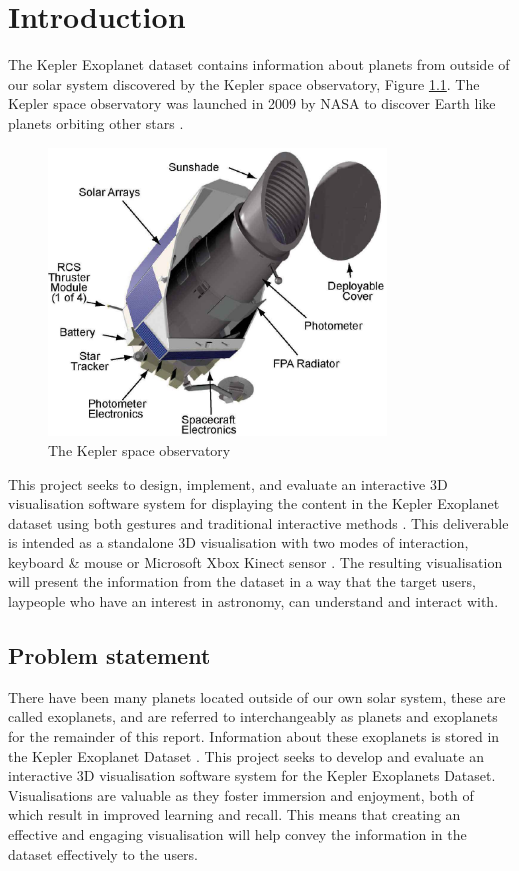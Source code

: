 \chapter{Introduction}\label{C:intro}
The Kepler Exoplanet dataset \cite{datasetphl} \cite{dataset}  contains information about planets from outside of
our solar system discovered by the Kepler space observatory, Figure
\ref{fig:keplerTele}. The Kepler space observatory was launched in 2009 by NASA
to discover Earth like planets orbiting other stars \cite{keplerTele}.

\begin{figure}[H]
  \centering
      \includegraphics[width=0.8\textwidth]{images/keplerTele.jpg}
  \caption{The Kepler space observatory}  
    \label{fig:keplerTele}
\end{figure}

This project seeks to design, implement, and evaluate an interactive 3D
visualisation software system for displaying the content in the Kepler
Exoplanet dataset using both gestures and traditional interactive methods
. This deliverable is intended as a standalone
3D visualisation with two modes of interaction, keyboard \& mouse or Microsoft
Xbox Kinect sensor \cite{kinect}. The resulting visualisation will present the
information from the dataset in a way that the target users, laypeople who have
an
interest in astronomy, can understand and interact with.
\section{Problem statement}
There have been many planets located outside of our own solar system,
these are called exoplanets, and are referred to interchangeably as planets and
exoplanets for the remainder of this report. Information about these exoplanets
is stored in the Kepler Exoplanet Dataset
. This project seeks to develop and evaluate an interactive 3D
visualisation software system for the Kepler Exoplanets Dataset. Visualisations
are valuable as they foster immersion and enjoyment, both of which result in
improved learning and recall. This means that
creating an effective and engaging visualisation will help convey the
information
in the dataset effectively to the users.

